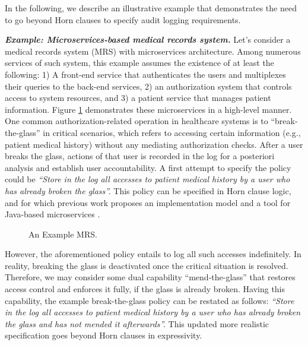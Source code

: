 In the following, we describe an illustrative example that demonstrates the need to go beyond Horn clauses to specify audit logging requirements.

\textbf{\textit{Example: Microservices-based medical records system.}}
Let's consider a medical records system (MRS) with microservices architecture. Among numerous services of such system, this example assumes the existence of at least the following: 1) A front-end service that authenticates the users and multiplexes their queries to the back-end services,  2) an authorization system that controls access to system resources, and 3) a patient service that manages patient information. Figure \ref{fig:mrs-mics} demonstrates these microservices in a high-level manner. One common authorization-related operation in healthcare systems is to ``break-the-glass'' \cite{matthews-gaebel-hie09} in critical scenarios, which refers to accessing certain information (e.g., patient medical history) without any mediating authorization checks. After a user breaks the glass, actions of that user is recorded in the log for a posteriori analysis and establish user accountability.  A first attempt to specify the policy could be \emph{``Store in the log all accesses to patient medical history by a user who has already broken the glass''.}  This policy can be specified in Horn clause logic, and for which previous work proposes an implementation model \cite{lsfa20} and a tool for Java-based  microservices \cite{stpsa21}.  

\begin{figure} 
	\centering
	\caption{An Example MRS.}
	\label{fig:mrs-mics}
\end{figure}

However, the aforementioned policy entails to log all such accesses indefinitely. In reality, breaking the glass is deactivated once the critical situation is resolved. Therefore, we may consider some dual capability ``mend-the-glass'' that restores access control and enforces it fully, if the glass is already broken. Having this capability, the example break-the-glass policy can be restated as follows: \emph{``Store in the log all accesses to patient medical history by a user who has already broken the glass and has not mended it afterwards''.}  This updated more realistic specification goes beyond Horn clauses in expressivity.

